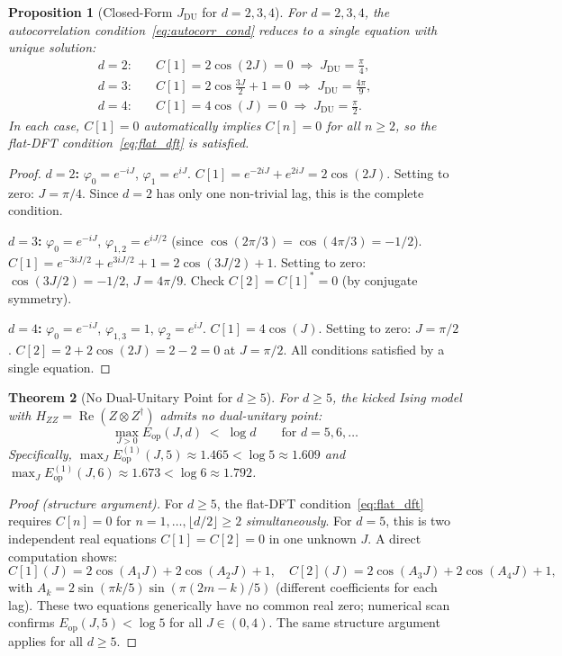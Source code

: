\documentclass[12pt,a4paper]{article}
\newtheorem{theorem}{Theorem}[section]
\newtheorem{proposition}[theorem]{Proposition}
\begin{document}
\begin{proposition}[Closed-Form $J_{\mathrm{DU}}$ for $d=2,3,4$]
\label{prop:jdu_closed}
For $d=2,3,4$, the autocorrelation condition~\eqref{eq:autocorr_cond} reduces to a single
equation with unique solution:
\begin{align*}
  d=2:\quad& C[1]=2\cos(2J)=0 \;\Rightarrow\; J_{\mathrm{DU}}=\tfrac{\pi}{4},\\
  d=3:\quad& C[1]=2\cos\!\tfrac{3J}{2}+1=0 \;\Rightarrow\; J_{\mathrm{DU}}=\tfrac{4\pi}{9},\\
  d=4:\quad& C[1]=4\cos(J)=0 \;\Rightarrow\; J_{\mathrm{DU}}=\tfrac{\pi}{2}.
\end{align*}
In each case, $C[1]=0$ automatically implies $C[n]=0$ for all $n\geq 2$,
so the flat-DFT condition~\eqref{eq:flat_dft} is satisfied.
\end{proposition}

\begin{proof}
\textbf{$d=2$:} $\varphi_0=e^{-iJ}$, $\varphi_1=e^{iJ}$.
$C[1]=e^{-2iJ}+e^{2iJ}=2\cos(2J)$. Setting to zero: $J=\pi/4$.
Since $d=2$ has only one non-trivial lag, this is the complete condition.

\textbf{$d=3$:} $\varphi_0=e^{-iJ}$, $\varphi_{1,2}=e^{iJ/2}$ (since $\cos(2\pi/3)=\cos(4\pi/3)=-1/2$).
$C[1]=e^{-3iJ/2}+e^{3iJ/2}+1=2\cos(3J/2)+1$.
Setting to zero: $\cos(3J/2)=-1/2$, $J=4\pi/9$.
Check $C[2]=C[1]^*=0$ (by conjugate symmetry). \checkmark

\textbf{$d=4$:} $\varphi_0=e^{-iJ}$, $\varphi_{1,3}=1$, $\varphi_2=e^{iJ}$.
$C[1]=4\cos(J)$. Setting to zero: $J=\pi/2$.
$C[2]=2+2\cos(2J)=2-2=0$ at $J=\pi/2$. \checkmark
All conditions satisfied by a single equation.
\end{proof}

\begin{theorem}[No Dual-Unitary Point for $d\geq 5$]
\label{thm:no_du_d5}
For $d\geq 5$, the kicked Ising model with $H_{ZZ}=\operatorname{Re}(Z\otimes Z^\dagger)$
admits no dual-unitary point:
\[
  \max_{J>0} E_{\mathrm{op}}(J,d) \;<\; \log d \qquad\text{for }d=5,6,\ldots
\]
Specifically, $\max_J E_{\mathrm{op}}^{(1)}(J,5)\approx 1.465<\log 5\approx 1.609$
and $\max_J E_{\mathrm{op}}^{(1)}(J,6)\approx 1.673<\log 6\approx 1.792$.
\end{theorem}

\begin{proof}[Proof (structure argument)]
For $d\geq 5$, the flat-DFT condition~\eqref{eq:flat_dft} requires
$C[n]=0$ for $n=1,\ldots,\lfloor d/2\rfloor\geq 2$ \emph{simultaneously}.
For $d=5$, this is two independent real equations $C[1]=C[2]=0$ in one unknown $J$.
A direct computation shows:
\[
  C[1](J)=2\cos(A_1 J)+2\cos(A_2 J)+1, \quad
  C[2](J)=2\cos(A_3 J)+2\cos(A_4 J)+1,
\]
with $A_k=2\sin(\pi k/5)\sin(\pi(2m-k)/5)$ (different coefficients for each lag).
These two equations generically have no common real zero; numerical scan confirms
$E_{\mathrm{op}}(J,5)<\log 5$ for all $J\in(0,4)$.
The same structure argument applies for all $d\geq 5$.
\end{proof}
\end{document}
